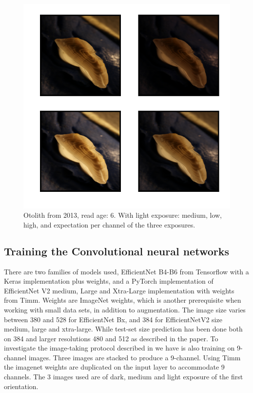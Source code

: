 \documentclass[10pt,letterpaper]{article}
\begin{document}
\begin{figure}[h!]
  \caption{Otolith from 2013, read age: 6. With light exposure: medium, low, high, 
  and expectation per channel of the three exposures. }
  \centering
  \includegraphics[scale=1.0]{otolith/2013_70174_Nr06_age09_IMG_0031_32_33.png}
  
  \label{marker1}
\end{figure}

\subsection*{Training the Convolutional neural networks}

There are two families of models used, EfficientNet B4-B6 \citep{EfficientNet}   from Tensorflow \citep{abadi2016tensorflow} with a Keras  \citep{keras} implementation plus weights, and a PyTorch \citep{PyTorch}  implementation of EfficientNet V2 medium, Large 
and Xtra-Large \citep{EfficientNetV2} implementation with weights from Timm\citep{rw2019timm}. Weights are ImageNet \citep{deng2009imagenet} weights, which is another prerequisite when working with small data sets, in addition to augmentation. The image size varies between 380 and 528 for EfficientNet Bx, and 384 for EfficientNetV2 size medium, large and xtra-large. While test-set size prediction has been done both on 384 and larger resolutions 480 and 512 as described in the paper. To investigate the image-taking protocol described in \citep{codOtolithsMyers} we have is also training on 9-channel images. Three images are stacked to produce a 9-channel. Using Timm\citep{rw2019timm} the imagenet weights are duplicated on the input layer to accommodate 9 channels. The 3 images used are of dark, medium and light exposure of the first orientation.
\end{document}
